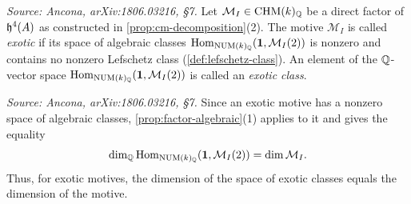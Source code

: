\begin{definition}
  \label{def:exotic-motive}
  \textit{Source: Ancona, arXiv:1806.03216, §7.}
  Let \(\mathcal{M}_I \in \mathrm{CHM}(k)_{\mathbb{Q}}\) be a direct factor of \(\mathfrak{h}^{4}(A)\) as
  constructed in \cref{prop:cm-decomposition}(2). The motive \(\mathcal{M}_I\) is
  called \emph{exotic} if its space of algebraic classes
  \(\mathrm{Hom}_{\mathrm{NUM}(k)_{\mathbb{Q}}}(\mathbf{1}, \mathcal{M}_I(2))\) is nonzero and contains no nonzero
  Lefschetz class (\cref{def:lefschetz-class}). An element of the \(\mathbb{Q}\)-vector
  space \(\mathrm{Hom}_{\mathrm{NUM}(k)_{\mathbb{Q}}}(\mathbf{1}, \mathcal{M}_I(2))\) is called an \emph{exotic
  class}.
\end{definition}

\begin{remark}
  \label{rem:exotic-equal-dim}
  \textit{Source: Ancona, arXiv:1806.03216, §7.}
  Since an exotic motive has a nonzero space of algebraic classes,
  \cref{prop:factor-algebraic}(1) applies to it and gives the equality
  \[\dim_{\mathbb{Q}} \mathrm{Hom}_{\mathrm{NUM}(k)_{\mathbb{Q}}}(\mathbf{1}, \mathcal{M}_I(2)) = \dim \mathcal{M}_I.\]
  Thus, for exotic motives, the dimension of the space of exotic classes equals
  the dimension of the motive.
\end{remark}

